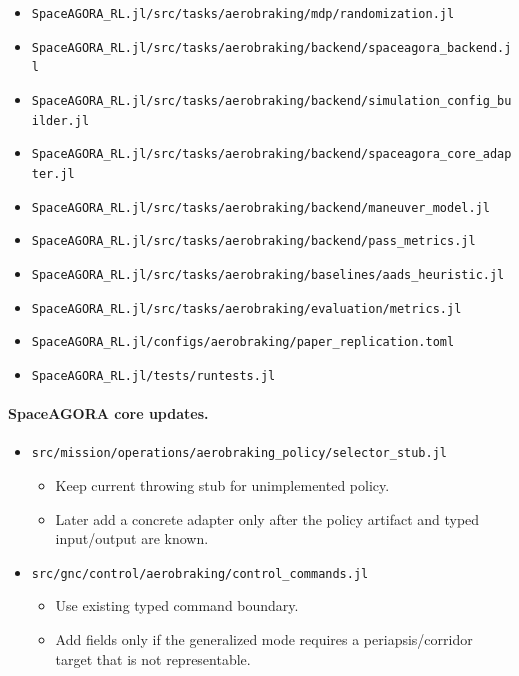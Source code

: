 \documentclass[11pt]{article}
\begin{document}
\begin{itemize}
\item \texttt{SpaceAGORA\_RL.jl/src/tasks/aerobraking/mdp/randomization.jl}
\item \texttt{SpaceAGORA\_RL.jl/src/tasks/aerobraking/backend/spaceagora\_backend.jl}
\item \texttt{SpaceAGORA\_RL.jl/src/tasks/aerobraking/backend/simulation\_config\_builder.jl}
\item \texttt{SpaceAGORA\_RL.jl/src/tasks/aerobraking/backend/spaceagora\_core\_adapter.jl}
\item \texttt{SpaceAGORA\_RL.jl/src/tasks/aerobraking/backend/maneuver\_model.jl}
\item \texttt{SpaceAGORA\_RL.jl/src/tasks/aerobraking/backend/pass\_metrics.jl}
\item \texttt{SpaceAGORA\_RL.jl/src/tasks/aerobraking/baselines/aads\_heuristic.jl}
\item \texttt{SpaceAGORA\_RL.jl/src/tasks/aerobraking/evaluation/metrics.jl}
\item \texttt{SpaceAGORA\_RL.jl/configs/aerobraking/paper\_replication.toml}
\item \texttt{SpaceAGORA\_RL.jl/tests/runtests.jl}
\end{itemize}

\paragraph{SpaceAGORA core updates.}

\begin{itemize}
\item \texttt{src/mission/operations/aerobraking\_policy/selector\_stub.jl}
\begin{itemize}
\item Keep current throwing stub for unimplemented policy.
\item Later add a concrete adapter only after the policy artifact and typed input/output are known.

\end{itemize}
\item \texttt{src/gnc/control/aerobraking/control\_commands.jl}
\begin{itemize}
\item Use existing typed command boundary.
\item Add fields only if the generalized mode requires a periapsis/corridor target that is not representable.
\end{itemize}
\end{itemize}
\end{document}
